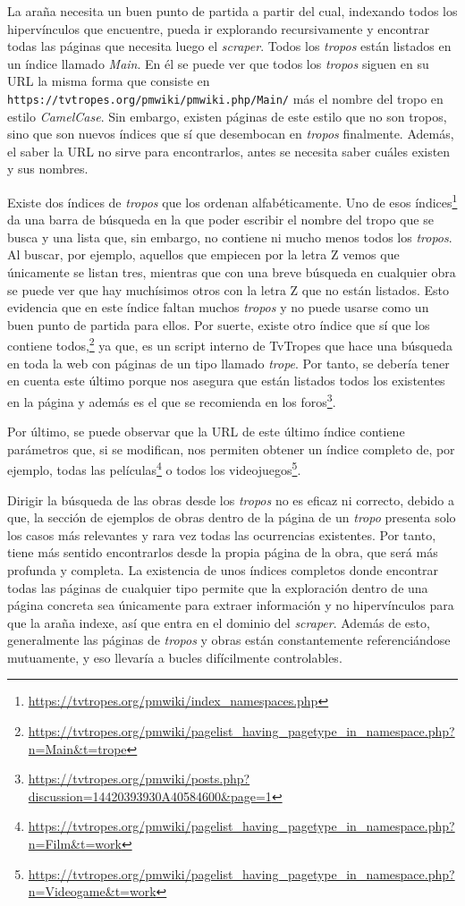 La araña necesita un buen punto de partida a partir del cual, indexando todos
los hipervínculos que encuentre, pueda ir explorando recursivamente y encontrar
todas las páginas que necesita luego el \textit{scraper}. Todos los
\textit{tropos} están listados en un índice llamado \textit{Main}. En él se
puede ver que todos los \textit{tropos} siguen en su URL la misma forma que
consiste en \texttt{https://tvtropes.org/pmwiki/pmwiki.php/Main/} más el nombre
del tropo en estilo \textit{CamelCase}. Sin embargo, existen páginas de este
estilo que no son tropos, sino que son nuevos índices que sí que desembocan en
\textit{tropos} finalmente. Además, el saber la URL no sirve para encontrarlos,
antes se necesita saber cuáles existen y sus nombres.

Existe dos índices de \textit{tropos} que los ordenan alfabéticamente. Uno de
esos índices\footnote{\url{https://tvtropes.org/pmwiki/index_namespaces.php}} da
una barra de búsqueda en la que poder escribir el nombre del tropo que se busca
y una lista que, sin embargo, no contiene ni mucho menos todos los
\textit{tropos}. Al buscar, por ejemplo, aquellos que empiecen por la letra Z
vemos que únicamente se listan tres, mientras que con una breve búsqueda en
cualquier obra se puede ver que hay muchísimos otros con la letra Z que no están
listados. Esto evidencia que en este índice faltan muchos \textit{tropos} y no
puede usarse como un buen punto de partida para ellos. Por suerte, existe otro
índice que sí que los contiene
todos,\footnote{\url{https://tvtropes.org/pmwiki/pagelist_having_pagetype_in_namespace.php?n=Main&t=trope}}
ya que, es un script interno de TvTropes que hace una búsqueda en toda la web
con páginas de un tipo llamado \textit{trope}. Por tanto, se debería tener en
cuenta este último porque nos asegura que están listados todos los existentes en
la página y además es el que se recomienda en los
foros\footnote{\url{https://tvtropes.org/pmwiki/posts.php?discussion=14420393930A40584600&page=1}}.

Por último, se puede observar que la URL de este último índice contiene
parámetros que, si se modifican, nos permiten obtener un índice completo de, por
ejemplo, todas las
películas\footnote{\url{https://tvtropes.org/pmwiki/pagelist_having_pagetype_in_namespace.php?n=Film&t=work}}
o todos los
videojuegos\footnote{\url{https://tvtropes.org/pmwiki/pagelist_having_pagetype_in_namespace.php?n=Videogame&t=work}}.

Dirigir la búsqueda de las obras desde los \textit{tropos} no es eficaz ni
correcto, debido a que, la sección de ejemplos de obras dentro de la página de
un \textit{tropo} presenta solo los casos más relevantes y rara vez todas las
ocurrencias existentes. Por tanto, tiene más sentido encontrarlos desde la
propia página de la obra, que será más profunda y completa. La existencia de
unos índices completos donde encontrar todas las páginas de cualquier tipo
permite que la exploración dentro de una página concreta sea únicamente para
extraer información y no hipervínculos para que la araña indexe, así que entra
en el dominio del \textit{scraper}. Además de esto, generalmente las páginas de
\textit{tropos} y obras están constantemente referenciándose mutuamente, y eso
llevaría a bucles difícilmente controlables.


